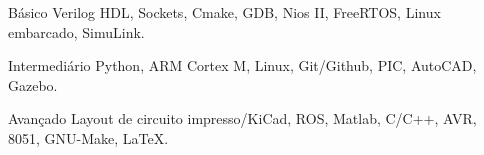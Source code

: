

\begin{cvskills}

  \cvskill
    {Básico} %
    {Verilog HDL, Sockets, Cmake, GDB, Nios II, FreeRTOS, Linux embarcado, SimuLink.} %

  \cvskill
    {Intermediário} %
    {Python, ARM Cortex M, Linux, Git/Github, PIC, AutoCAD, Gazebo.} %

  \cvskill
    {Avançado} %
    {Layout de circuito impresso/KiCad, ROS, Matlab, C/C++, AVR, 8051, GNU-Make, LaTeX.} %

\end{cvskills}




